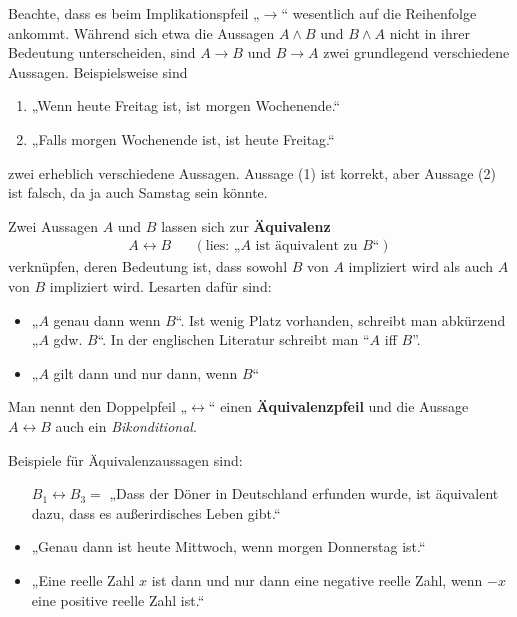 \begin{bem}
    Beachte, dass es beim Implikationspfeil „$\to$“ wesentlich auf die Reihenfolge ankommt. Während sich etwa die Aussagen $A\land B$ und $B\land A$ nicht in ihrer Bedeutung unterscheiden, sind $A\to B$ und $B\to A$ zwei grundlegend verschiedene Aussagen. Beispielsweise sind
    \begin{enumerate}[(1)]
        \item „Wenn heute Freitag ist, ist morgen Wochenende.“
        \item „Falls morgen Wochenende ist, ist heute Freitag.“
    \end{enumerate}
    zwei erheblich verschiedene Aussagen. Aussage (1) ist korrekt, aber Aussage (2) ist falsch, da ja auch Samstag sein könnte.
\end{bem}


\begin{de}[Äquivalenz] 
    Zwei Aussagen $A$ und $B$ lassen sich zur \textbf{Äquivalenz}
    \begin{align*}
        A\leftrightarrow B  && (\text{lies: „$A$ ist äquivalent zu $B$“})
    \end{align*}
    verknüpfen, deren Bedeutung ist, dass sowohl $B$ von $A$ impliziert wird als auch $A$ von $B$ impliziert wird. Lesarten dafür sind:
    \begin{itemize}
        \item „$A$ genau dann wenn $B$“. Ist wenig Platz vorhanden, schreibt man abkürzend „$A$ gdw. $B$“. In der englischen Literatur schreibt man ``$A$ iff $B$''.
        \item „$A$ gilt dann und nur dann, wenn $B$“
    \end{itemize}
    Man nennt den Doppelpfeil „$\leftrightarrow$“ einen \textbf{Äquivalenzpfeil} und die Aussage $A\leftrightarrow B$ auch ein \emph{Bikonditional}.
\end{de}

    
\begin{bsp}
    Beispiele für Äquivalenzaussagen sind:
    \begin{itemize}[labelindent=5.5em, labelwidth=, leftmargin=*]
        \item[$B_1\leftrightarrow B_3=$] „Dass der Döner in Deutschland erfunden wurde, ist äquivalent dazu, dass es außerirdisches Leben gibt.“
        \item „Genau dann ist heute Mittwoch, wenn morgen Donnerstag ist.“
        \item „Eine reelle Zahl $x$ ist dann und nur dann eine negative reelle Zahl, wenn $-x$ eine positive reelle Zahl ist.“
    \end{itemize}
\end{bsp}

